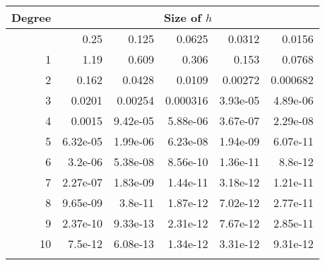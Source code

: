 \begin{tabular}{|r|r|r|r|r|r|}    
    \hline
    Degree &        \multicolumn{5}{c|}{Size of $h$}          \\

    \hline
    & 0.25     & 0.125    & 0.0625   & 0.0312   & 0.0156   \\
    \hline
 1  & 1.19     & 0.609    & 0.306    & 0.153    & 0.0768   \\
    \hline
 2  & 0.162    & 0.0428   & 0.0109   & 0.00272  & 0.000682 \\
    \hline
 3  & 0.0201   & 0.00254  & 0.000316 & 3.93e-05 & 4.89e-06 \\
    \hline
 4  & 0.0015   & 9.42e-05 & 5.88e-06 & 3.67e-07 & 2.29e-08 \\
    \hline
 5  & 6.32e-05 & 1.99e-06 & 6.23e-08 & 1.94e-09 & 6.07e-11 \\
    \hline
 6  & 3.2e-06  & 5.38e-08 & 8.56e-10 & 1.36e-11 & 8.8e-12  \\
    \hline
 7  & 2.27e-07 & 1.83e-09 & 1.44e-11 & 3.18e-12 & 1.21e-11 \\
    \hline
 8  & 9.65e-09 & 3.8e-11  & 1.87e-12 & 7.02e-12 & 2.77e-11 \\
    \hline
 9  & 2.37e-10 & 9.33e-13 & 2.31e-12 & 7.67e-12 & 2.85e-11 \\
    \hline
 10 & 7.5e-12  & 6.08e-13 & 1.34e-12 & 3.31e-12 & 9.31e-12 \\
\hline
\label{tab:convergence_H1}
\end{tabular}